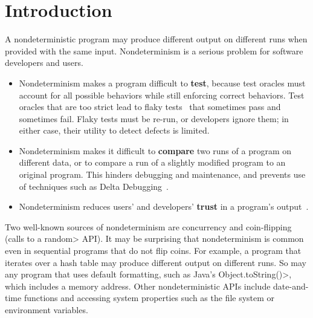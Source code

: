 \section{Introduction}

A nondeterministic program may produce different output on different runs
when provided with the same input.
Nondeterminism is a serious problem for software developers and users.
\begin{itemize}
\item
  Nondeterminism makes a program difficult to \textbf{test}, because test
  oracles must account for all possible behaviors while still enforcing
  correct behaviors.  Test oracles that are too strict lead to flaky
  tests~\cite{LuoHEM2014,nondex,deflaker,Rahman:2018:IFF:3236024.3275529,Sudarshan}
  that sometimes pass and sometimes fail.  Flaky tests must be re-run, or
  developers ignore them; in either case, their utility to detect defects
  is limited.
\item
  Nondeterminism makes it difficult to \textbf{compare} two runs of a
  program on different data, or to compare a run of a slightly modified
  program to an original program.  This hinders debugging and maintenance,
  and prevents use of techniques such as Delta Debugging~\cite{Zeller1999,YuLCZ2012}.
\item
  Nondeterminism reduces users' and developers' \textbf{trust} in a program's output~\cite{Tene,Shah}.
\end{itemize}

Two well-known sources of nondeterminism are concurrency
and coin-flipping
(calls to a \<random> API\@).
It may be surprising that nondeterminism is common even in sequential
programs that do not flip coins.
For example, a program that iterates over a hash table
may produce different output on different runs.
So may any program that uses default formatting, such as Java's
\<Object.toString()>, which includes a memory address.
Other nondeterministic APIs include date-and-time functions and
accessing system properties such as the file system or environment variables.


